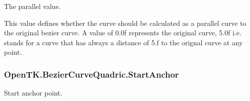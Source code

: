 The parallel value. 

This value defines whether the curve should be calculated as a parallel curve to the original bezier curve. A value of 0.\-0f represents the original curve, 5.\-0f i.\-e. stands for a curve that has always a distance of 5.\-f to the orignal curve at any point.\hypertarget{struct_open_t_k_1_1_bezier_curve_quadric_a6def7a3c3025026c39422238b0f3b721}{
\subsubsection[{Start\-Anchor}]{ Open\-T\-K.\-Bezier\-Curve\-Quadric.\-Start\-Anchor}}\label{struct_open_t_k_1_1_bezier_curve_quadric_a6def7a3c3025026c39422238b0f3b721}


Start anchor point. 

